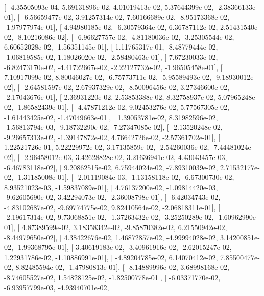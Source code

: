 \documentclass{article}
\begin{document}
       [ -4.35505093e-04,   5.69131896e-02,   4.01019413e-02,
          5.37644399e-02,  -2.38366133e-01],
       [ -6.56659477e-02,   3.91257314e-02,   7.60166689e-02,
         -8.95173368e-02,  -1.97977974e-01],
       [  4.94980185e-02,  -6.30579364e-02,   6.36787112e-02,
          2.51431540e-02,  -8.10216086e-02],
       [ -6.96627757e-02,  -4.81180036e-02,  -3.25305544e-02,
          6.60652028e-02,  -1.56351145e-01],
       [  1.11765317e-01,  -8.48779444e-02,  -1.06819585e-02,
          1.18026020e-02,  -2.58480463e-01],
       [  7.67230033e-02,  -6.82473170e-02,  -4.41722667e-02,
         -2.22127732e-02,  -1.96505458e-01],
       [  7.10917099e-02,   8.80046027e-02,  -6.75773711e-02,
         -5.95589493e-02,  -9.18930012e-02],
       [ -2.64581597e-02,   2.67937329e-02,  -8.50096456e-02,
          3.27346600e-02,  -2.17043676e-01],
       [  2.36931220e-02,   2.53853388e-02,   8.32758937e-02,
          5.07965248e-02,  -1.86582439e-01],
       [ -4.47871212e-02,   9.02453276e-02,   5.77567305e-02,
         -1.61443425e-02,  -1.47049663e-01],
       [  1.39053781e-02,   8.31982596e-02,  -1.56813794e-03,
         -9.18732290e-02,  -7.27347085e-02],
       [ -2.13520248e-02,  -9.26657313e-02,  -1.39147872e-02,
          4.76642726e-02,  -2.57361702e-01],
       [  1.22521726e-01,   5.22229972e-02,   3.17135859e-02,
         -2.54260036e-02,  -7.44481024e-02],
       [ -2.96458012e-03,   3.42628828e-02,   3.21636941e-02,
          4.43043457e-03,  -6.46783118e-02],
       [  9.20862515e-02,   6.75944024e-02,  -7.89310039e-02,
          2.71532177e-02,  -1.31185008e-01],
       [ -2.01119084e-03,  -1.13158118e-02,  -6.67300730e-02,
          8.93521023e-03,  -1.59837089e-01],
       [  4.76137200e-02,  -1.09814420e-03,  -9.62605690e-02,
          3.42294073e-02,  -2.36008798e-01],
       [ -6.42034743e-02,  -4.83102687e-02,  -9.69774775e-02,
          9.82410564e-02,  -2.06818311e-01],
       [ -2.19617314e-02,   9.73068851e-02,  -1.37263432e-02,
         -3.25250289e-02,  -1.60962990e-01],
       [  4.87389599e-02,   3.18358342e-02,  -9.85870382e-02,
          6.21550942e-02,  -8.44979650e-02],
       [  4.38422676e-02,   1.46872857e-02,  -4.99994028e-02,
          3.14200851e-02,  -1.99368795e-01],
       [  3.40619183e-02,  -3.40961916e-02,  -2.62015247e-02,
          1.22931786e-02,  -1.10886991e-01],
       [ -4.89204785e-02,   6.14070412e-02,   7.85500477e-02,
          8.82485594e-02,  -1.47980813e-01],
       [ -8.14889996e-02,   3.68998168e-02,  -8.74605527e-02,
          1.54828125e-02,  -1.82500778e-01],
       [ -6.03371770e-02,  -6.93957799e-03,  -4.93940701e-02,
\end{document}
